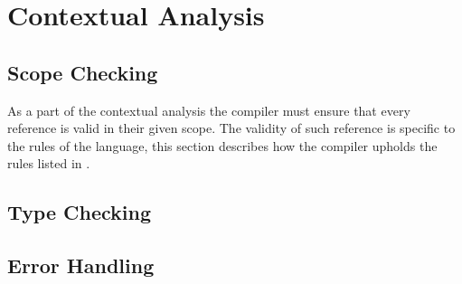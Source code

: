 \chapter{Contextual Analysis}



\section{Scope Checking}
As a part of the contextual analysis the compiler must ensure that every reference is valid in their given scope.
The validity of such reference is specific to the rules of the language, this section describes how the compiler upholds the rules listed in .


\section{Type Checking}


\section{Error Handling}





